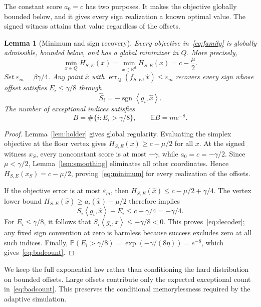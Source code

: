 \documentclass[11pt,a4paper]{article}
\newtheorem{lemma}[theorem]{Lemma}
\theoremstyle{definition}
\theoremstyle{remark}
\newcommand{\R}{\mathbb R}
\newcommand{\E}{\mathbb E}
\newcommand{\Prb}{\mathbb P}
\newcommand{\eps}{\varepsilon}
\newcommand{\ip}[2]{\left\langle #1,#2\right\rangle}
\DeclareMathOperator{\sgn}{sgn}
\DeclareMathOperator{\err}{err}
\begin{document}
The constant score $a_0=c$ has two purposes. It makes the objective globally
bounded below, and it gives every sign realization a known optimal value.
The signed witness attains that value regardless of the offsets.

\begin{lemma}[Minimum and sign recovery]\label{lem:packing}
Every objective in~\eqref{eq:family} is globally admissible, bounded below,
and has a global minimizer in $Q$. More precisely,
\begin{equation}\label{eq:minimum}
  \min_{x\in Q}H_{S,E}(x)
  =\min_{x\in\R^d}H_{S,E}(x)=c-\frac\mu2.
\end{equation}
Set $\eps_m=\beta\gamma/4$. Any point $\widehat x$ with
$\err_Q(f_{S,E},\widehat x)\le\eps_m$ recovers every sign whose offset
satisfies $E_i\le\gamma/8$ through
\begin{equation}\label{eq:decoder}
  \widehat S_i=-\sgn\ip{g_i}{\widehat x}.
\end{equation}
The number of exceptional indices satisfies
\begin{equation}\label{eq:badcount}
  B=\#\{i:E_i>\gamma/8\},\qquad \E B=me^{-8}.
\end{equation}
\end{lemma}

\begin{proof}
Lemma~\ref{lem:holder} gives global regularity. Evaluating the simplex
objective at the floor vertex gives $H_{S,E}(x)\ge c-\mu/2$ for all $x$.
At the signed witness $x_S$, every nonconstant score is at most $-\gamma$,
while $a_0=c=-\gamma/2$. Since $\mu<\gamma/2$,
Lemma~\ref{lem:smoothing} eliminates all other coordinates. Hence
$H_{S,E}(x_S)=c-\mu/2$, proving~\eqref{eq:minimum} for every realization of
the offsets.

If the objective error is at most $\eps_m$, then
$H_{S,E}(\widehat x)\le c-\mu/2+\gamma/4$.
The vertex lower bound
$H_{S,E}(\widehat x)\ge a_i(\widehat x)-\mu/2$ therefore implies
\[
  S_i\ip{g_i}{\widehat x}-E_i
  \le c+\gamma/4=-\gamma/4.
\]
For $E_i\le\gamma/8$, it follows that
$S_i\ip{g_i}{\widehat x}\le-\gamma/8<0$.
This proves~\eqref{eq:decoder}; any fixed sign convention at zero is harmless
because success excludes zero at all such indices.
Finally,
$\Prb(E_i>\gamma/8)=\exp(-\gamma/(8\eta))=e^{-8}$,
which gives~\eqref{eq:badcount}.
\end{proof}

We keep the full exponential law rather than conditioning the hard
distribution on bounded offsets. Large offsets contribute only the expected
exceptional count in~\eqref{eq:badcount}. This preserves the conditional
memorylessness required by the adaptive simulation.
\end{document}
